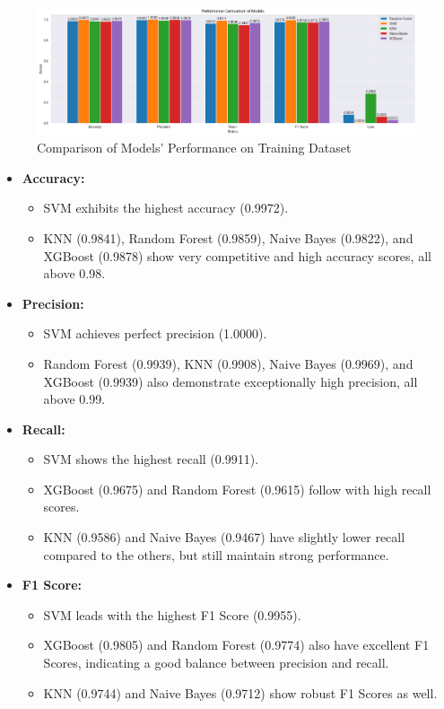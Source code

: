 \begin{figure}[H]
    \centering
    \includegraphics[width=\linewidth]{images/models_performance_train}
    \caption{Comparison of Models' Performance on Training Dataset}
    \label{fig:models_performance_train}
\end{figure}

\begin{itemize}
    \item \textbf{Accuracy:}
    \begin{itemize}
        \item SVM exhibits the highest accuracy (0.9972).
        \item KNN (0.9841), Random Forest (0.9859), Naive Bayes (0.9822), and XGBoost (0.9878) show very competitive and high accuracy scores, all above 0.98.
    \end{itemize}

    \item \textbf{Precision:}
    \begin{itemize}
        \item SVM achieves perfect precision (1.0000).
        \item Random Forest (0.9939), KNN (0.9908), Naive Bayes (0.9969), and XGBoost (0.9939) also demonstrate exceptionally high precision, all above 0.99.
    \end{itemize}

    \item \textbf{Recall:}
    \begin{itemize}
        \item SVM shows the highest recall (0.9911).
        \item XGBoost (0.9675) and Random Forest (0.9615) follow with high recall scores.
        \item KNN (0.9586) and Naive Bayes (0.9467) have slightly lower recall compared to the others, but still maintain strong performance.
    \end{itemize}

    \item \textbf{F1 Score:}
    \begin{itemize}
        \item SVM leads with the highest F1 Score (0.9955).
        \item XGBoost (0.9805) and Random Forest (0.9774) also have excellent F1 Scores, indicating a good balance between precision and recall.
        \item KNN (0.9744) and Naive Bayes (0.9712) show robust F1 Scores as well.
    \end{itemize}


\end{itemize}
